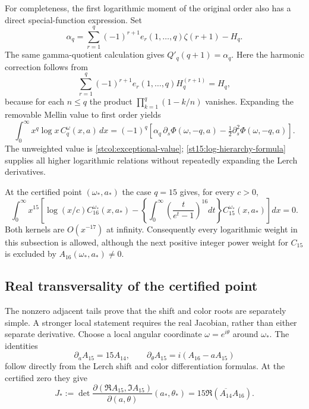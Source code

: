 For completeness, the first logarithmic moment of the original order
also has a direct special-function expression.  Set
\[
 \alpha_q=\sum_{r=1}^q(-1)^{r+1}
             e_r(1,\ldots,q)\zeta(r+1)-H_q.
\]
The same gamma-quotient calculation gives $Q'_q(q+1)=\alpha_q$.
Here the harmonic correction follows from
\[
 \sum_{r=1}^q(-1)^{r+1}e_r(1,\ldots,q)H_q^{(r+1)}=H_q,
\]
because for each $n\le q$ the product
$\prod_{k=1}^q(1-k/n)$ vanishes.  Expanding the removable Mellin
value to first order yields
\begin{equation}\label{st15:first-log-moment}
 \int_0^\infty x^q\log x\,C_q^\omega(x,a)\,dx
  =(-1)^q\left[
       \alpha_q\,\partial_s\Phi(\omega,-q,a)
       -\tfrac12\partial_s^2\Phi(\omega,-q,a)\right].
\end{equation}
The unweighted value is \eqref{stcol:exceptional-value};
\eqref{st15:log-hierarchy-formula} supplies all higher logarithmic
relations without repeatedly expanding the Lerch derivatives.

At the certified point $(\omega_*,a_*)$ the case $q=15$ gives, for
every $c>0$,
\begin{equation}\label{st15:certified-log-identity}
 \int_0^\infty x^{15}\left[
      \log(x/c)C_{16}^{\omega_*}(x,a_*)
          -\left\{\int_0^\infty
               \left(\frac{t}{e^t-1}\right)^{16}dt\right\}
                 C_{15}^{\omega_*}(x,a_*)\right]dx=0.
\end{equation}
Both kernels are $O(x^{-17})$ at infinity.  Consequently every logarithmic
weight in this subsection is allowed, although the next positive integer
power weight for $C_{15}$ is excluded by $A_{16}(\omega_*,a_*)\ne0$.

\subsection{Real transversality of the certified point}
\label{st15:transversality}

The nonzero adjacent tails prove that the shift and color roots are
separately simple.  A stronger local statement requires the real
Jacobian, rather than either separate derivative.  Choose a local
angular coordinate $\omega=e^{i\theta}$ around $\omega_*$.  The identities
\[
 \partial_a A_{15}=15A_{14},\qquad
 \partial_\theta A_{15}=i(A_{16}-aA_{15})
\]
follow directly from the Lerch shift and color differentiation formulas.
At the certified zero they give
\begin{equation}\label{st15:Jacobian}
 J_*:=\det\frac{\partial(\Re A_{15},\Im A_{15})}
                    {\partial(a,\theta)}(a_*,\theta_*)
       =15\Re\!\left(\overline{A_{14}}A_{16}\right).
\end{equation}

